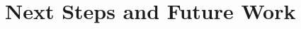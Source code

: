 \documentclass[10pt]{beamer}
\makeatletter
\newif\ifdraft
\newcommand{\todoin}[1]{\ifdraft{\todo[inline]{TODO:\@ #1}}\fi}
\makeatother
\begin{document}







\section{Next Steps and Future Work}
\end{document}
